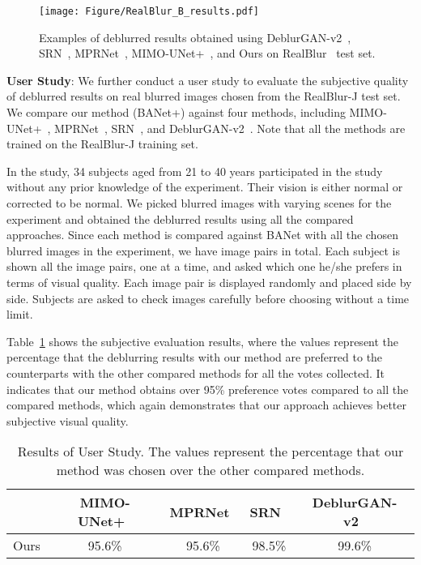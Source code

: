 \begin{figure*}[t!]
\centering
\texttt{[image: Figure/RealBlur\_B\_results.pdf]}
\vspace{-0.1in}
\caption{Examples of deblurred results obtained using DeblurGAN-v2~\cite{Kupyn_2019_ICCV}, SRN~\cite{tao2018srndeblur},  MPRNet~\cite{Zamir_2021_CVPR}, MIMO-UNet+~\cite{MIMO}, and Ours on RealBlur~\cite{rim_2020_ECCV} test set.}
\label{fig:RealBlur_B}
\vspace{-0.1in}
\end{figure*}

\noindent\textbf{User Study}:
We further conduct a user study to evaluate the subjective quality of deblurred results on real blurred images chosen from the RealBlur-J test set. We compare our method (BANet+) against four methods, including MIMO-UNet+~\cite{MIMO}, MPRNet~\cite{Zamir_2021_CVPR}, SRN~\cite{tao2018srndeblur}, and DeblurGAN-v2~\cite{Kupyn_2019_ICCV}. Note that all the methods are trained on the RealBlur-J training set.

In the study, 34 subjects aged from 21 to 40 years participated in the study without any prior knowledge of the experiment. Their vision is either normal or corrected to be normal. We picked  blurred images with varying scenes for the experiment and obtained the deblurred results using all the compared approaches.
Since each method is compared against BANet with all the chosen blurred images in the experiment, we have  image pairs in total. Each subject is shown all the image pairs, one at a time, and asked which one he/she prefers in terms of visual quality. Each image pair is displayed randomly and placed side by side. Subjects are asked to check images carefully before choosing without a time limit.

Table~\ref{tab:user study} shows the subjective evaluation results, where the values represent the percentage that the deblurring results with our method are preferred to the counterparts with the other compared methods for all the votes collected. It indicates that our method obtains over 95\% preference votes compared to all the compared methods, which again demonstrates that our approach achieves better subjective visual quality.



\begin{table}[t]
\centering
\setlength{\tabcolsep}{1mm}
\caption{Results of User Study. The values represent the percentage that our method was chosen over the other compared methods.}
\begin{tabular}{c|cccc}\hline
 & MIMO-UNet+~\cite{MIMO} & MPRNet~\cite{Zamir_2021_CVPR}  & SRN~\cite{tao2018srndeblur} & DeblurGAN-v2~\cite{Kupyn_2019_ICCV} \\\hline
Ours & 95.6\% & 95.6\%  & 98.5\% &  99.6\% \\\hline 
\end{tabular}
\label{tab:user study}
\vspace{-0.1in}
\end{table}

